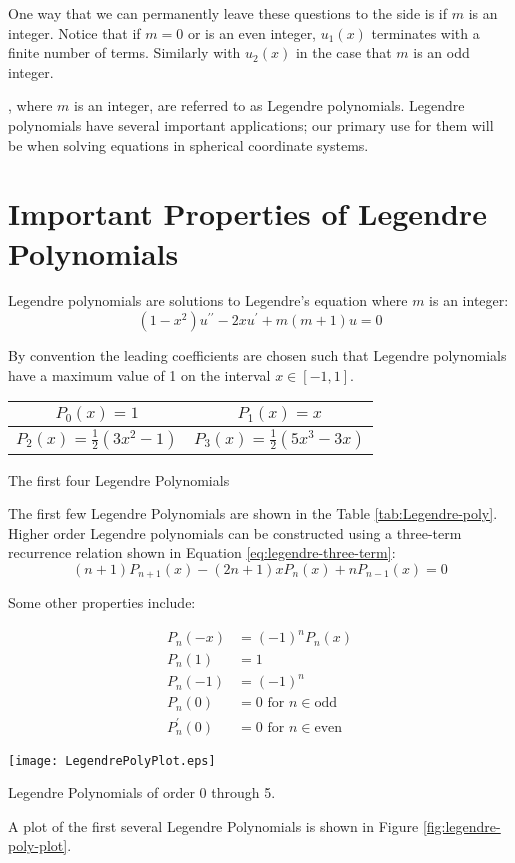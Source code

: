 One way that we can permanently leave these questions to the side is if $m$ is an integer.  Notice that if $m=0$ or is an even integer, $u_1(x)$ terminates with a finite number of terms. Similarly with $u_2(x)$ in the case that $m$ is an odd integer. 

, where $m$ is an integer, are referred to as Legendre polynomials.  Legendre polynomials have several important applications; our primary use for them will be when solving equations in spherical coordinate systems.

\section{Important Properties of Legendre Polynomials}
Legendre polynomials are solutions to Legendre's equation where $m$ is an integer:
\begin{equation*}
\left(1-x^2 \right)u^{\prime \prime} - 2xu^{\prime} + m(m+1)u = 0
\end{equation*}

By convention the leading coefficients are chosen such that Legendre polynomials have a maximum value of 1 on the interval $x\in[-1,1]$.  

\begin{margintable}
\begin{tabular}{c | c}
$P_0(x) = 1$ & $P_1(x) = x$ \\\hline
$P_2(x) = \frac{1}{2}(3x^2-1)$ & $P_3(x) = \frac{1}{2}(5x^3-3x)$ \\
\end{tabular}
\caption{The first four Legendre Polynomials}
\label{tab:Legendre-poly}
\end{margintable}
The first few Legendre Polynomials are shown in the Table \ref{tab:Legendre-poly}. Higher order Legendre polynomials can be constructed using a three-term recurrence relation shown in Equation \ref{eq:legendre-three-term}:
\begin{equation}
(n+1)P_{n+1}(x) - (2n+1)xP_n(x) + nP_{n-1}(x) = 0
\label{eq:legendre-three-term}
\end{equation}

\vspace{4.0cm}

Some other properties include:

\begin{align*}
P_n(-x) &= (-1)^nP_n(x) \\
P_n(1) &= 1 \\
P_n(-1) &= (-1)^n \\
P_n(0) &= 0 \text{ for } n\in{\text{odd}} \\
P_n^{\prime}(0) &=0 \text{ for } n\in{\text{even}}
\end{align*}
\begin{marginfigure}
\texttt{[image: LegendrePolyPlot.eps]}
\caption{Legendre Polynomials of order 0 through 5.}
\label{fig:legendre-poly-plot}
\end{marginfigure}
A plot of the first several Legendre Polynomials is shown in Figure \ref{fig:legendre-poly-plot}.


